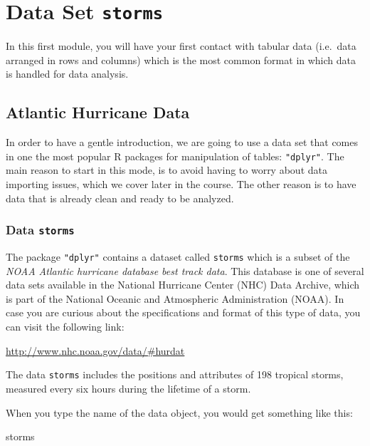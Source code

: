 \documentclass[
]{book}
\newenvironment{Shaded}{\begin{snugshade}}{\end{snugshade}}
\newcommand{\NormalTok}[1]{#1}
\begin{document}
\hypertarget{storms}{%
\chapter{\texorpdfstring{Data Set \texttt{storms}}{Data Set storms}}\label{storms}}

In this first module, you will have your first contact with tabular data
(i.e.~data arranged in rows and columns) which is
the most common format in which data is handled for data analysis.

\hypertarget{atlantic-hurricane-data}{%
\section{Atlantic Hurricane Data}\label{atlantic-hurricane-data}}

In order to have a gentle introduction, we are going to use a data set that
comes in one the most popular R packages for manipulation of tables: \texttt{"dplyr"}.
The main reason to start in this mode, is to avoid having to worry about data
importing issues, which we cover later in the course. The other reason is to
have data that is already clean and ready to be analyzed.

\hypertarget{data-storms}{%
\subsection{\texorpdfstring{Data \texttt{storms}}{Data storms}}\label{data-storms}}

The package \texttt{"dplyr"} contains a dataset called \texttt{storms}
which is a subset of the \emph{NOAA Atlantic hurricane database best track data}.
This database is one of several data sets available in the National Hurricane
Center (NHC) Data Archive, which is part of the National Oceanic and Atmospheric
Administration (NOAA). In case you are curious about the specifications and
format of this type of data, you can visit the following link:

\url{http://www.nhc.noaa.gov/data/\#hurdat}

The data \texttt{storms} includes the positions and attributes of 198 tropical storms,
measured every six hours during the lifetime of a storm.

When you type the name of the data object, you would get something like this:

\begin{Shaded}
\begin{Highlighting}[]
\NormalTok{storms}
\end{Highlighting}
\end{Shaded}
\end{document}
